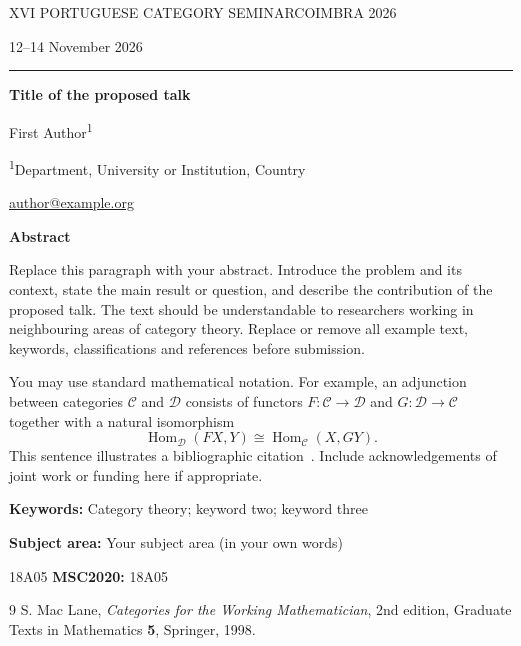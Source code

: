 \documentclass[11pt,a4paper]{article}
\makeatletter
\newcommand{\talktitle}{Title of the proposed talk}
\newcommand{\talkauthors}{First Author\textsuperscript{1}}
\newcommand{\talkaffiliations}{%
  \textsuperscript{1}Department, University or Institution, Country}
\newcommand{\talkemail}{author@example.org}
\newcommand{\talkkeywords}{Category theory; keyword two; keyword three}
\newcommand{\talksubject}{Your subject area (in your own words)}
\newcommand{\talkmsc}{18A05} %
\makeatother
\begin{document}
{\small\sffamily\color{PCSGold}
 XVI PORTUGUESE CATEGORY SEMINAR\hfill COIMBRA 2026\par}
\vspace{0.2em}
{\small\sffamily\color{PCSGray}12--14 November 2026\par}
{\color{PCSGold}\rule{\linewidth}{0.7pt}}

\vspace{1.5em}
{\LARGE\bfseries \talktitle\par}
\vspace{0.6em}
{\large \talkauthors\par}
\vspace{0.2em}
{\small\color{PCSGray}\talkaffiliations\par}
{\small\href{mailto:\talkemail}{\talkemail}\par}

\vspace{1.1em}
{\large\bfseries Abstract\par}

Replace this paragraph with your abstract. Introduce the problem and its
context, state the main result or question, and describe the contribution
of the proposed talk. The text should be understandable to researchers
working in neighbouring areas of category theory. Replace or remove all
example text, keywords, classifications and references before submission.

You may use standard mathematical notation. For example, an adjunction
between categories $\mathcal{C}$ and $\mathcal{D}$ consists of functors
$F\colon\mathcal{C}\to\mathcal{D}$ and
$G\colon\mathcal{D}\to\mathcal{C}$ together with a natural isomorphism
\[
  \operatorname{Hom}_{\mathcal{D}}(FX,Y)
  \cong
  \operatorname{Hom}_{\mathcal{C}}(X,GY).
\]
This sentence illustrates a bibliographic citation~\cite{maclane}.
Include acknowledgements of joint work or funding here if appropriate.

\vspace{0.7em}
{\small
 \textbf{Keywords:} \talkkeywords\par
 \textbf{Subject area:} \talksubject\par
 \ifx\talkmsc\empty\else
   \textbf{MSC2020:} \talkmsc\par
 \fi
}

\renewcommand{\refname}{References}
\begin{thebibliography}{9}
\small
{}
S. Mac Lane, \emph{Categories for the Working Mathematician},
2nd edition, Graduate Texts in Mathematics \textbf{5}, Springer, 1998.
\end{thebibliography}
\end{document}
